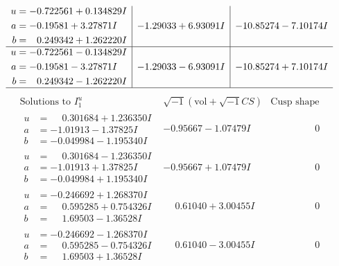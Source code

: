 \documentclass[1p]{elsarticle_modified}
\theoremstyle{definition}
\newcommand{\I}{\sqrt{-1}}
\begin{document}
$$\begin{array}{c|c|c}
\begin{aligned}
u &= -0.722561 + 0.134829 I \\
a &= -0.19581 + 3.27871 I \\
b &= \phantom{-}0.249342 + 1.262220 I\end{aligned}
 & -1.29033 + 6.93091 I & -10.85274 - 7.10174 I \\ \hline\begin{aligned}
u &= -0.722561 - 0.134829 I \\
a &= -0.19581 - 3.27871 I \\
b &= \phantom{-}0.249342 - 1.262220 I\end{aligned}
 & -1.29033 - 6.93091 I & -10.85274 + 7.10174 I\\
 \hline 
 \end{array}$$\newpage$$\begin{array}{c|c|c}  
\text{Solutions to }I^u_{1}& \I (\text{vol} + \sqrt{-1}CS) & \text{Cusp shape}\\
 \hline 
\begin{aligned}
u &= \phantom{-}0.301684 + 1.236350 I \\
a &= -1.01913 - 1.37825 I \\
b &= -0.049984 - 1.195340 I\end{aligned}
 & -0.95667 - 1.07479 I & \phantom{-0.000000 } 0 \\ \hline\begin{aligned}
u &= \phantom{-}0.301684 - 1.236350 I \\
a &= -1.01913 + 1.37825 I \\
b &= -0.049984 + 1.195340 I\end{aligned}
 & -0.95667 + 1.07479 I & \phantom{-0.000000 } 0 \\ \hline\begin{aligned}
u &= -0.246692 + 1.268370 I \\
a &= \phantom{-}0.595285 + 0.754326 I \\
b &= \phantom{-}1.69503 - 1.36528 I\end{aligned}
 & \phantom{-}0.61040 + 3.00455 I & \phantom{-0.000000 } 0 \\ \hline\begin{aligned}
u &= -0.246692 - 1.268370 I \\
a &= \phantom{-}0.595285 - 0.754326 I \\
b &= \phantom{-}1.69503 + 1.36528 I\end{aligned}
 & \phantom{-}0.61040 - 3.00455 I & \phantom{-0.000000 } 0 \\ \hline\begin{aligned}

\end{aligned}
\end{array}$$
\end{document}

